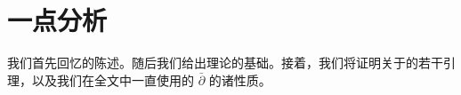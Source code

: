 
\chapter{一点分析}
\label{ch:appendix-analysis}

我们首先回忆\trArzelaAscoliTheorem{}的陈述。随后我们给出\trFredholm{}理论的基础。接着，我们将证明关于\trEllipticRegularity{}的若干引理，以及我们在全文中一直使用的 $\bar{\partial}$ 的诸性质。






